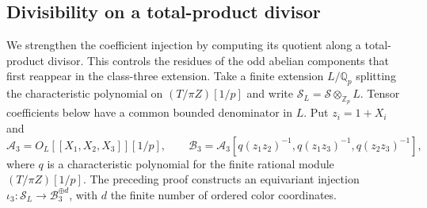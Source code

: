 \documentclass[11pt]{article}
\theoremstyle{definition}\newtheorem{definition}[theorem]{Definition}
\begin{document}
\subsection{Divisibility on a total-product divisor}
\label{subsec:degree-three-saturation}

We strengthen the coefficient injection by computing
its quotient along a total-product divisor. This controls
the residues of the odd abelian components that first
reappear in the class-three extension.
Take a finite extension $L/\mathbb Q_p$ splitting the
characteristic polynomial on $(T/\pi Z)[1/p]$ and write
$\mathcal S_L=\mathcal S\otimes_{\mathbb Z_p}L$.
Tensor coefficients below have a common bounded
denominator in $L$. Put $z_i=1+X_i$ and
\[
 \mathcal A_3=O_L[[X_1,X_2,X_3]][1/p],\qquad
 \mathcal B_3=\mathcal A_3
       [q(z_1z_2)^{-1},q(z_1z_3)^{-1},q(z_2z_3)^{-1}],
\]
where $q$ is a characteristic polynomial for the finite
rational module $(T/\pi Z)[1/p]$.
The preceding proof constructs an equivariant injection
$\iota_3:\mathcal S_L\to\mathcal B_3^{\oplus d}$,
with $d$ the finite number of ordered color coordinates.
\end{document}
